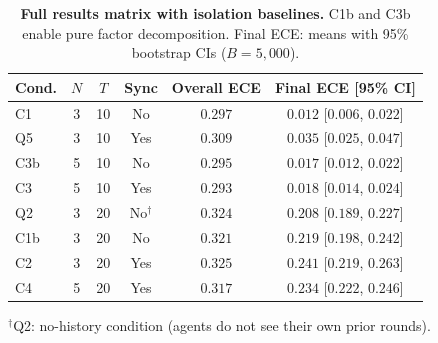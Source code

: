 \documentclass[11pt]{article}
\begin{document}
\begin{table}[H]
\centering
\caption{\textbf{Full results matrix with isolation baselines.} C1b and C3b enable pure factor decomposition. Final ECE: means with 95\% bootstrap CIs ($B{=}5{,}000$).}
\label{tab:results}
\begin{tabular}{@{}lccccc@{}}
\toprule
Cond. & $N$ & $T$ & Sync & Overall ECE & Final ECE [95\% CI] \\
\midrule
C1  & 3 & 10 & No  & $0.297$ & $0.012$ [$0.006$, $0.022$] \\
Q5  & 3 & 10 & Yes & $0.309$ & $0.035$ [$0.025$, $0.047$] \\
C3b & 5 & 10 & No  & $0.295$ & $0.017$ [$0.012$, $0.022$] \\
C3  & 5 & 10 & Yes & $0.293$ & $0.018$ [$0.014$, $0.024$] \\
\midrule
Q2  & 3 & 20 & No$^\dagger$ & $0.324$ & $0.208$ [$0.189$, $0.227$] \\
C1b & 3 & 20 & No  & $0.321$ & $0.219$ [$0.198$, $0.242$] \\
C2  & 3 & 20 & Yes & $0.325$ & $0.241$ [$0.219$, $0.263$] \\
C4  & 5 & 20 & Yes & $0.317$ & $0.234$ [$0.222$, $0.246$] \\
\bottomrule
\end{tabular}
\smallskip
{\footnotesize $^\dagger$Q2: no-history condition (agents do not see their own prior rounds).}
\end{table}
\end{document}
